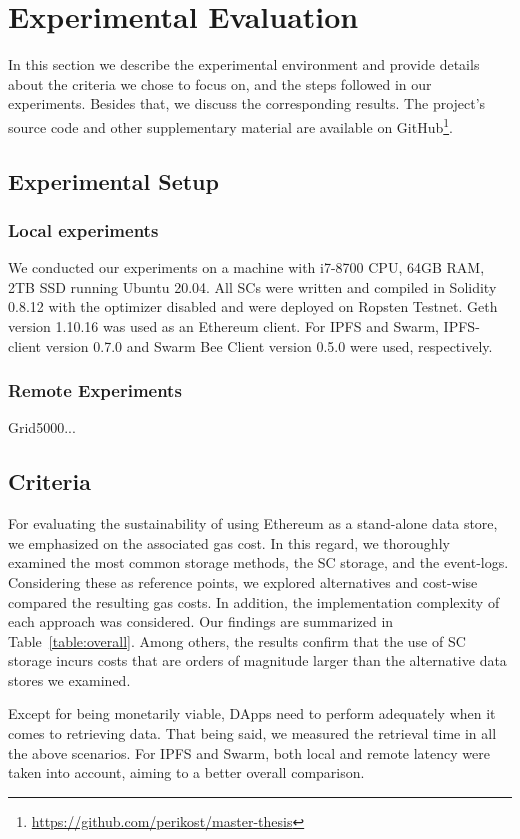 \chapter{Experimental Evaluation}\label{chapter:experiments}
In this section we describe the experimental environment and provide details about the criteria we chose to focus on, and the steps followed in our experiments. Besides that, we discuss the corresponding results. The project's source code and other supplementary material are available on GitHub\footnote{\url{https://github.com/perikost/master-thesis}}.

\section{Experimental Setup}\label{sec:}
\subsection{Local experiments}\label{sec:}
We conducted our experiments on a machine with i7-8700 CPU, 64GB RAM, 2TB SSD running Ubuntu 20.04. All SCs were written and compiled in Solidity 0.8.12 with the optimizer disabled and were deployed on Ropsten Testnet. Geth version 1.10.16 was used as an Ethereum client. For IPFS and Swarm, IPFS-client version 0.7.0 and Swarm Bee Client version 0.5.0 were used, respectively.
\subsection{Remote Experiments}\label{sec:}
Grid5000...
\section{Criteria}\label{sec:}
For evaluating the sustainability of using Ethereum as a stand-alone data store, we emphasized on the associated gas cost. In this regard, we thoroughly examined the most common storage methods, the SC storage, and the event-logs. Considering these as reference points, we explored alternatives and cost-wise compared the resulting gas costs. In addition, the implementation complexity of each approach was considered. Our findings are summarized in Table~\ref{table:overall}. Among others, the results confirm that the use of SC storage incurs costs that are orders of magnitude larger than the alternative data stores we examined.

Except for being monetarily viable, DApps need to perform adequately when it comes to retrieving data. That being said, we measured the retrieval time in all the above scenarios. For IPFS and Swarm, both local and remote latency were taken into account, aiming to a better overall comparison.

